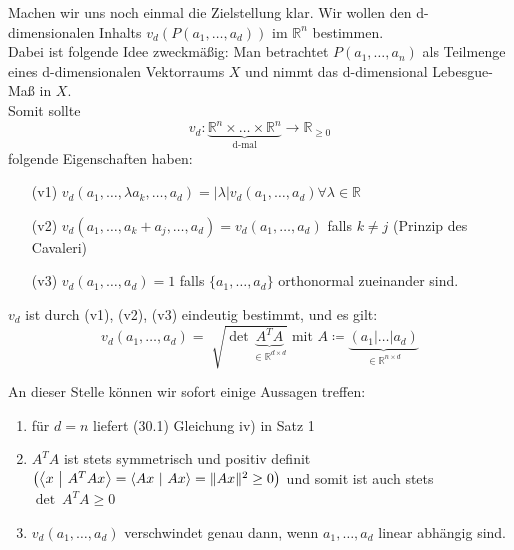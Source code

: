 Machen wir uns noch einmal die Zielstellung klar. Wir wollen den d-dimensionalen Inhalts
$v_d (P(a_1, \ldots, a_d))$ im $\mathbb{R}^n $ bestimmen.\\
Dabei ist folgende Idee zweckmäßig: Man betrachtet $P(a_1, \ldots, a_n)$ als Teilmenge eines d-dimensionalen
Vektorraums $X$ und nimmt das d-dimensional Lebesgue-Maß in $X$.\\
Somit sollte 
\begin{equation*}
	v_d: 
	\underbrace{\mathbb{R}^n \times \ldots \times \mathbb{R}^n }_{\text{d-mal}}
	\rightarrow \mathbb{R}_{\geq 0}
\end{equation*}
folgende Eigenschaften haben:
\begin{enumerate}
    \item[(v1)]
        $v_d (a_1, \ldots, \lambda a_k, \ldots, a_d) = |\lambda| v_d(a_1, \ldots, a_d)
        \forall \lambda \in \mathbb{R} $
    \item[(v2)]
        $v_d (a_1, \ldots, a_k + a_j, \ldots, a_d) = v_d(a_1, \ldots, a_d) $
        falls $k \neq j$ (Prinzip des Cavaleri)
    \item[(v3)]
        $v_d(a_1, \ldots, a_d) = 1 $ falls $\lbrace a_1, \ldots, a_d \rbrace $
        orthonormal zueinander sind.
\end{enumerate}

\begin{satz}
    $v_d$ ist durch (v1), (v2), (v3) eindeutig bestimmt, und es gilt:
    \begin{equation}
        v_d(a_1, \ldots, a_d) = 
        \sqrt[]{\det \underbrace{A^T A}_{\in \mathbb{R}^{d \times d}}}
        \text{ mit } 
        A \coloneqq\underbrace{(a_1 | \ldots | a_d)}_{\in \mathbb{R}^{n \times d}}
    \end{equation}
\end{satz}
An dieser Stelle können wir sofort einige Aussagen treffen:\\
\begin{enumerate}
    \item
        für $d=n $ liefert (30.1) Gleichung iv) in Satz 1
    \item
        $A^T A $ ist stets symmetrisch und positiv definit
        $\left( \left\langle x \ \middle| \ A^T Ax\right\rangle=
        \left\langle Ax \ \middle| \ Ax\right\rangle= \|Ax\|^2 \geq 0 \right)$
        und somit ist auch stets $\det\ A^T A \geq 0 $
    \item
        $v_d (a_1, \ldots, a_d)$ verschwindet genau dann, wenn $a_1, \ldots, a_d$ linear abhängig sind.
\end{enumerate}

